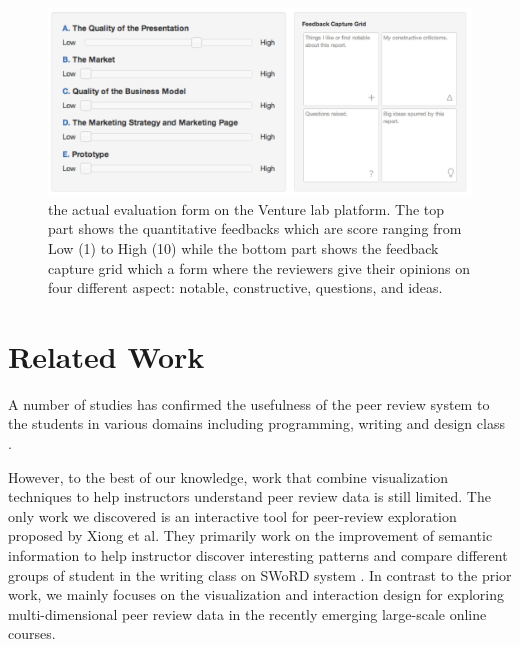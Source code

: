\documentclass{sigchi}
\begin{document}
\begin{figure}[!t]
\centering
\includegraphics[width=\columnwidth]{images/review-form}
\caption{the actual evaluation form on the Venture lab platform.
The top part shows the quantitative feedbacks which are score ranging
from Low (1) to High (10) while the bottom part shows the feedback capture grid
which a form where the reviewers give their opinions
on four different aspect: notable, constructive, questions, and ideas.}
\label{fig:review-form}
\end{figure}


\section{Related Work}

A number of studies has confirmed the usefulness of the peer review system
to the students in various domains including programming, writing and design class
\cite{MyPeerReview,WebBasedPeerReview,de2009assessment}.

However, to the best of our knowledge, work that combine visualization
techniques to help instructors understand peer review data is still limited.
The only work we discovered is  an interactive tool for peer-review
exploration proposed by Xiong et al. \cite{xiong} They primarily work on the
improvement of semantic information to help instructor discover interesting
patterns and compare different groups of student in the writing class on SWoRD
system \cite{Cho2007}. In contrast to the prior work, we mainly focuses on the
visualization and interaction design for exploring multi-dimensional peer
review data in the recently emerging large-scale online courses.
\end{document}
